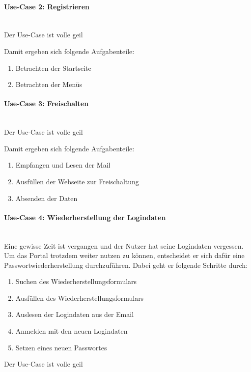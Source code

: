 \paragraph{Use-Case 2: Registrieren}\quad\\
Der Use-Case ist volle geil

Damit ergeben sich folgende Aufgabenteile:
\begin{enumerate}

		\item Betrachten der Startseite
		\item Betrachten der Menüs
\end{enumerate}

\paragraph{Use-Case 3: Freischalten}\quad\\
Der Use-Case ist volle geil

Damit ergeben sich folgende Aufgabenteile:
\begin{enumerate}

		\item Empfangen und Lesen der Mail
		\item Ausfüllen der Webseite zur Freischaltung
		\item Absenden der Daten
\end{enumerate}


\paragraph{Use-Case 4: Wiederherstellung der Logindaten}\quad\\
Eine gewisse Zeit ist vergangen und der Nutzer hat seine Logindaten vergessen. Um das Portal trotzdem weiter nutzen zu können, entscheidet er sich dafür eine Passwortwiederherstellung durchzuführen. 
Dabei geht er folgende Schritte durch:
\begin{enumerate}
\item Suchen des Wiederherstellungsformulars
\item Ausfüllen des Wiederherstellungsformulars
\item Auslesen der Logindaten aus der Email
\item Anmelden mit den neuen Logindaten
\item Setzen eines neuen Passwortes
\end{enumerate}
Der Use-Case ist volle geil


